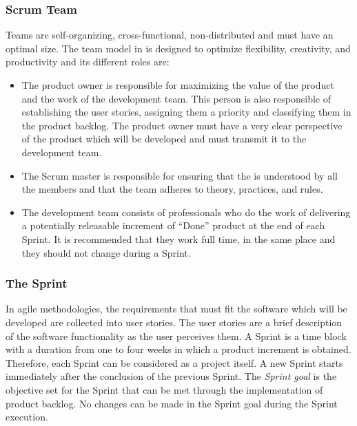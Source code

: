 \subsubsection{Scrum Team} \label{5-ScrumTeam}
 Teams are self-organizing, cross-functional, non-distributed and must have an optimal size. The team model in  is designed to optimize flexibility, creativity, and productivity and its different roles are:

\begin{itemize}
	\item {} The product owner is responsible for maximizing the value of the product and the work of the	development team. This person is also responsible of establishing the user stories, assigning them a priority and classifying them in the product backlog. The product owner must have a very clear perspective of the product which will be developed and must transmit it to the development team.
	
	\item {} The Scrum master is responsible for ensuring that the  is understood by all the members and that the  team adheres to  theory, practices, and rules. 
	
	\item {} The development team consists of professionals who do the work of delivering a potentially releasable increment of “Done” product at the end of each Sprint. It is recommended that they work full time, in the same place and they should not change during a Sprint.
\end{itemize}


\subsubsection{The Sprint}
In agile methodologies, the requirements that must fit the software which will be developed are collected into user stories. The user stories \cite{Coh04} are a brief description of the software functionality as the user perceives them. A Sprint is a time block with a duration from one to four weeks in which a product increment is obtained. Therefore, each Sprint can be considered as a project itself. A new Sprint starts immediately after the conclusion of the previous Sprint. The \emph{Sprint goal} is the objective set for the Sprint that can be met through the implementation of product backlog. No changes can be made in the Sprint goal during the Sprint execution. 


